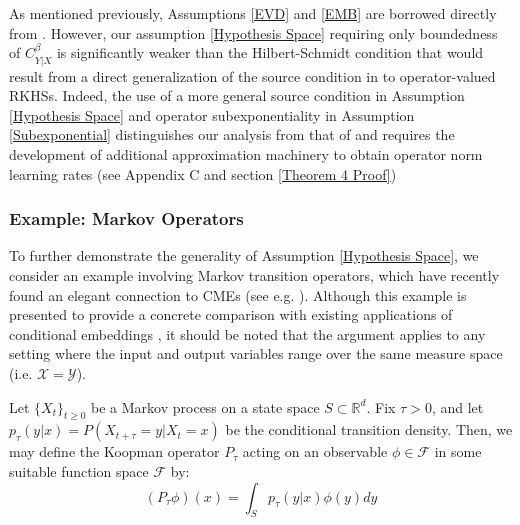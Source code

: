 \documentclass[accepted]{article}
\theoremstyle{definition}
\begin{document}
As mentioned previously, Assumptions \ref{EVD} and \ref{EMB} are borrowed directly from \cite{fischer2020sobolev}. However, our assumption \ref{Hypothesis Space} requiring only boundedness of $C^{\beta}_{Y|X}$ is significantly weaker than the Hilbert-Schmidt condition that would result from a direct generalization of the source condition in \cite{fischer2020sobolev} to operator-valued RKHSs. Indeed, the use of a more general source condition in Assumption \ref{Hypothesis Space} and operator subexponentiality in Assumption \ref{Subexponential} distinguishes our analysis from that of \cite{fischer2020sobolev} and requires the development of additional approximation machinery to obtain operator norm learning rates (see Appendix C and section \ref{Theorem 4 Proof})



\subsubsection{Example: Markov Operators}
\par To further demonstrate the generality of Assumption \ref{Hypothesis Space}, we consider an example involving Markov transition operators, which have recently found an elegant connection to CMEs (see e.g. \cite{mollenhauer2020nonparametric, mollenhauer2020kernel}). Although this example is presented to provide a concrete comparison with existing applications of conditional embeddings \citep{grunewalder2012modelling, lever2016compressed}, it should be noted that the argument applies to any setting where the input and output variables range over the same measure space (i.e. $\mathcal{X} = \mathcal{Y}$).

\par Let $\{X_t\}_{t \geq 0}$ be a Markov process on a state space $S \subset \mathbb{R}^d$. Fix $\tau > 0$, and let $p_{\tau}(y | x) = P(X_{t + \tau} = y | X_{t} = x)$ be the conditional transition density. Then, we may define the Koopman operator $P_{\tau}$ acting on an observable $\phi \in \mathcal{F}$ in some suitable function space $\mathcal{F}$ by:
\begin{equation*}
    (P_{\tau}\phi)(x) = \int_{S} p_{\tau}(y|x)\phi(y)dy
\end{equation*}
\end{document}
